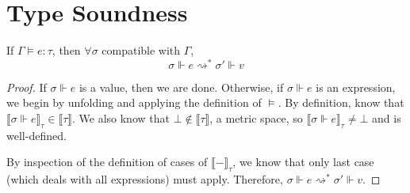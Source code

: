 \section{Type Soundness}
\begin{lemma}[Termination]\label{thm:termination}
  If $\Gamma \vDash e : \tau$, then $\forall \sigma$ compatible with $\Gamma$, 
  $$\sigma \Vdash e \rightsquigarrow^* \sigma' \Vdash v$$
\end{lemma}
\begin{proof}
  If $\sigma \Vdash e$ is a value, then we are done. Otherwise, if $\sigma
  \Vdash e$ is an expression, we begin by unfolding and applying the definition
  of $\vDash$. By definition, know that $\llbracket \sigma \Vdash e \rrbracket_{\tau} \in
  \llbracket \tau \rrbracket$. We also know that $\bot \not\in \llbracket \tau
  \rrbracket$, a metric space, so $\llbracket \sigma \Vdash e \rrbracket_{\tau}
  \not= \bot$ and is well-defined.

  By inspection of the definition of cases of $\llbracket - \rrbracket_{\tau}$,
  we know that only last case (which deals with all expressions) must apply.
  Therefore, $\sigma \Vdash e \rightsquigarrow^* \sigma' \Vdash v$.
\end{proof}


